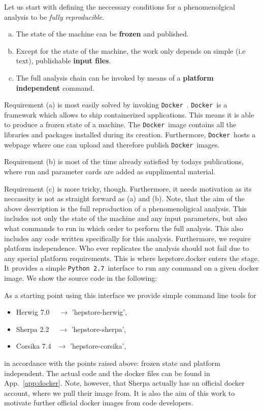 \documentclass[aps,prd,11pt,tightenlines,superscriptaddress,nofootinbib,preprintnumbers,notitlepage]{revtex4-1}
\newcommand{\python}{\texttt{Python~2.7}}
\newcommand{\docker}{\texttt{Docker}}
\begin{document}
%
\begin{minipage}{\textwidth}
  Let us start with defining the neccessary conditions for a
  phenomenolgical analysis to be \emph{fully reproducible}.
  \begin{enumerate}[(a)]
  \item The state of the machine can be {\bf frozen} and published.
  \item Except for the state of the machine, the work only depends on
    simple (i.e text), publishable {\bf input files}.
  \item The full analysis chain can be invoked by means of a
    {\bf platform independent} command.
  \end{enumerate}
\end{minipage}
\medskip
%

Requirement (a) is most easily solved by invoking
\docker~\cite{}. \docker~is a framework which allows to ship
containerized applications. This means it is able to produce a frozen
state of a machine. The \docker~image contains all the libraries and
packages installed during its creation. Furthermore, \docker~hosts a
webpage where one can upload and therefore publish \docker~images.

Requirement (b) is most of the time already satisfied by todays
publications, where run and parameter cards are added as supplimental
material.

Requirement (c) is more tricky, though. Furthermore, it needs
motivation as its neccassity is not as straight forward as (a) and
(b). Note, that the aim of the above description is the full
reproduction of a phenomenoligical analysis. This includes not only
the state of the machine and any input parameters, but also what
commands to run in which order to perform the full analysis. This also
includes any code written specifically for this analysis. Furthermore,
we require platform independence. Who ever replicates the analysis
should not fail due to any special platform requirements. This is
where hepstore.docker enters the stage. It provides a simple
\python~interface to run any command on a given docker image. We show
the source code in the following:
%
\begin{changemargin}{1.5cm}{1.5cm} 
  
\end{changemargin}
%
As a starting point using this interface we provide simple command
line tools for
%
\begin{itemize}
\item Herwig 7.0 ~$~~\rightarrow$ 'hepstore-herwig',
\item Sherpa 2.2 ~$~~\rightarrow$ 'hepstore-sherpa',
\item Corsika 7.4 $~~\rightarrow$ 'hepstore-corsika',
\end{itemize}
%
in accordance with the points raised above: frozen state and platform
independent. The actual code and the docker files can be found in
App.~\ref{app:docker}. Note, however, that Sherpa actually has an
official docker account, where we pull their image from. It is also
the aim of this work to motivate further official docker images from
code developers.
\end{document}
